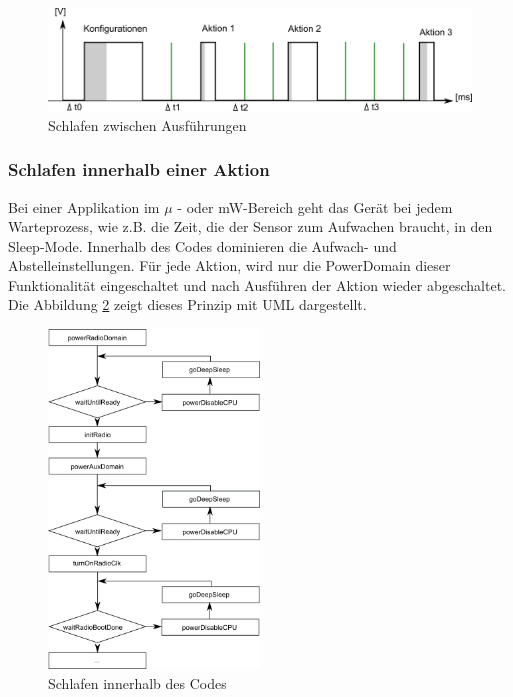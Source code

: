 \begin{figure}[ht]
    \includegraphics[width=\textwidth]{2TheoretischeGrundlagen/imag/SleepGrundprinzip.png}
    \caption{Schlafen zwischen Ausführungen}
    \label{sleep_Grundprinzip} 
\end{figure}

\subsubsection{Schlafen innerhalb einer Aktion}
Bei einer Applikation im $\mu$ - oder mW-Bereich geht das Gerät bei jedem Warteprozess, wie z.B. die Zeit, die der Sensor zum Aufwachen braucht, in den Sleep-Mode. Innerhalb des Codes dominieren die Aufwach- und Abstelleinstellungen. Für jede Aktion, wird nur die PowerDomain dieser Funktionalität eingeschaltet und nach Ausführen der Aktion wieder abgeschaltet. Die Abbildung \ref{sleep_intern} zeigt dieses Prinzip mit UML dargestellt.

\begin{figure}[ht]
    \includegraphics[width=0.5\textwidth]{2TheoretischeGrundlagen/imag/SleepInFunktion.png}
    \caption{Schlafen innerhalb des Codes}
    \label{sleep_intern} 
\end{figure}


